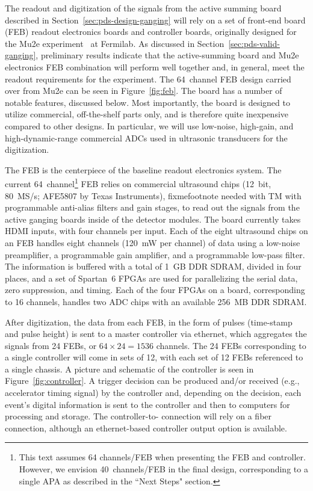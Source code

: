 The readout and digitization of the signals from the active summing board described in Section~\ref{sec:pds-design-ganging} will rely on a set of front-end board (FEB) readout electronics boards and controller boards, originally designed for the Mu2e experiment~\cite{bib:mu2e_tdr} %
at Fermilab. As discussed in Section~\ref{sec:pds-valid-ganging}, preliminary results indicate that the active-summing board and Mu2e electronics FEB combination will perform well together and, in general, meet the readout requirements for the experiment. The 64~channel FEB design carried over from Mu2e can be seen in Figure~\ref{fig:feb}. The board has a number of notable features, discussed below. Most importantly, %
the board is designed to utilize commercial, off-the-shelf parts only, and is therefore quite inexpensive compared to other designs. In particular, we will use low-noise, high-gain, and high-dynamic-range commercial ADCs used in ultrasonic transducers %
for the digitization.

The FEB is the centerpiece of the baseline readout electronics system. %
The current 64~channel\footnote{This text assumes 64 channels/FEB when presenting the FEB and controller. However, we envision 40~channels/FEB in the final design, corresponding to a single APA as described in the ``Next Steps" section.} FEB relies on commercial ultrasound chips (12~bit, 80~MS/s; AFE5807 by Texas Instruments),
fixme{footnote needed with TM}  with programmable anti-alias filters and gain stages, to read out the  signals from the active ganging boards inside of the detector modules. The board currently takes HDMI inputs, with four channels per input.  Each of the eight ultrasound chips on an FEB handles eight channels (\SI{120}{mW} per channel) of data using a low-noise preamplifier, a programmable gain amplifier, and a programmable low-pass filter. The information is buffered with a total of \SI{1}{GB} DDR SDRAM, divided in four places, and a set of Spartan~6 FPGAs are used for parallelizing the serial  data, zero suppression, and timing. Each of the four FPGAs on a board, corresponding to 16 channels, handles two ADC chips with an available \SI{256}{MB} DDR SDRAM. 

After digitization, the data from each FEB, in the form of pulses (time-stamp and pulse height) is sent to a master controller via ethernet, which aggregates the signals from 24 FEBs, or $64 \times 24=1536$ channels. The 24 FEBs corresponding to a single controller will come in sets of 12, with each set of 12 FEBs referenced to a single chassis. A picture and schematic of the controller is seen in Figure~\ref{fig:controller}. A trigger decision can be produced and/or received (e.g., accelerator timing signal) by the controller and, depending on the decision, each event's digital information is sent to the controller and then to  computers for processing and storage. The controller-to- connection will rely on a fiber connection, although an ethernet-based controller output option is available.

